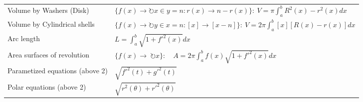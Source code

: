 \begin{landscape}
\begin{multicols*}{2}
\begin{tabularx}{\columnwidth}{@{}lX@{}}
            Volume by Washers (Disk)            & $\{f(x)\to\circlearrowright x\in y=n:r(x)\to n-r(x)\}:\ V=\pi\int_{a}^{b}R^2(x)-r^2(x)dx$                                                                                                                                                                                                                              \\
            Volume by Cylindrical shells        & $\{f(x)\to\circlearrowright y\in x=n:[x]\to [x-n]\}:\ V=2\pi\int_{a}^{b}[x][R(x)-r(x)]dx$                                                                                                                                                                                                                              \\
            Arc length                          & $L=\int_{a}^{b}\sqrt{1+f'^2(x)}dx$                                                                                                                                                                                                                                                                                     \\
            Area surfaces of revolution         & $\{f(x)\to\ \circlearrowright x\}:\quad A=2\pi\int_{a}^{b}f(x)\sqrt{1+f'^2(x)}dx$                                                                                                                                                                                                                                      \\
            Parametized equations (above 2)     & $\sqrt{f'^2(t)+g'^2(t)}$                                                                                                                                                                                                                                                                                               \\
            Polar equations (above 2)           & $\sqrt{r^2(\theta)+r'^2(\theta)}$                                                                                                                                                                                                                                                                                      \\
        \end{tabularx}


\end{multicols*}
\end{landscape}
